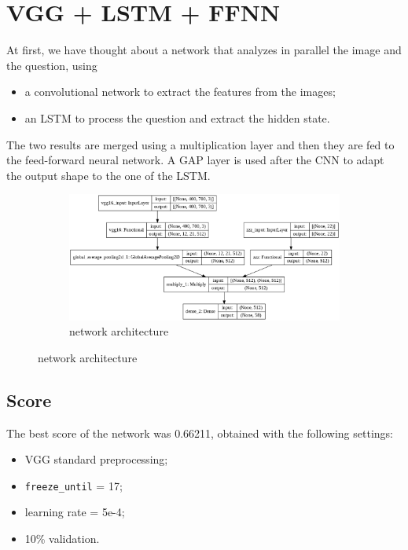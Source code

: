 \documentclass[12pt,a4paper]{report}
\begin{document}
		\section{VGG + LSTM + FFNN}
At first, we have thought about a network that analyzes in parallel the image and the question, using
\begin{itemize}
\item{a convolutional network to extract the features from the images;}
\item{an LSTM to process the question and extract the hidden state.}
\end{itemize}
The two results are merged using a multiplication layer and then they are fed to the feed-forward neural network.
A GAP layer is used after the CNN to adapt the output shape to the one of the LSTM.
\begin{figure}[H]
\renewcommand*\thesubfigure{\arabic{subfigure}} 
\centering
\begin{subfigure}{\textwidth}
  \centering
  \includegraphics[width=1\linewidth]{model}
  \caption{network architecture}
  \label{fig:sub1}
\end{subfigure}
\end{figure}
\subsection{Score}
	The best score of the network was 0.66211, obtained with the following settings:

\begin{itemize}
	\item VGG standard preprocessing;
	\item \texttt{freeze\_until} = 17;
	\item learning rate = 5e-4;
	\item 10\% validation.
\end{itemize}
		
\end{document}
